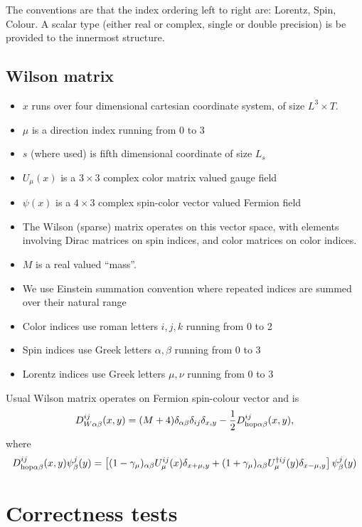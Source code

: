 \documentclass[letter,10pt]{report}
\begin{document}
The conventions are that the index ordering left to right are: Lorentz, Spin, Colour. A scalar type (either real
or complex, single or double precision) is be provided to the innermost structure.


\subsection{Wilson matrix}

\begin{itemize}
\item $x$ runs over four dimensional cartesian coordinate system, of size $L^3\times T$.
\item $\mu$ is a direction index running from 0 to 3
\item $s$ (where used) is fifth dimensional coordinate of size $L_s$
\item $U_\mu(x)$ is a $3\times 3$ complex color matrix valued gauge field
\item $\psi(x)$ is a $4\times 3$ complex spin-color vector valued Fermion field
\item The Wilson (sparse) matrix operates on this vector space, with elements involving Dirac matrices on spin indices, and color
  matrices on color indices.
\item $M$ is a real valued ``mass''.
\item We use Einstein summation convention where repeated indices are summed over their natural range
\item Color indices use roman letters $i, j, k $ running from 0 to 2
\item Spin indices use Greek letters $\alpha, \beta$ running from 0 to 3
\item Lorentz indices use Greek letters $\mu,\nu$ running from 0 to 3
\end{itemize}

Usual Wilson matrix operates on Fermion spin-colour vector and is
$$D_{W \alpha\beta}^{ij}(x,y) = (M+4)\delta_{\alpha\beta}\delta_{ij}\delta_{x,y} - \frac{1}{2} D_{ {\rm hop}\alpha\beta}^{ij}(x,y),$$ 
where
\begin{equation}
D_{\rm hop \alpha\beta}^{ij}(x,y)\psi^j_\beta(y) = \left[(1-\gamma_\mu)_{\alpha\beta} U^{ij}_\mu(x) \delta_{x+\mu,y} +
                                    (1+\gamma_\mu)_{\alpha\beta} U_\mu^{\dagger ij}(y) \delta_{x-\mu,y} \right]\psi^j_\beta(y)
\end{equation}

\section{Correctness tests}
\end{document}
